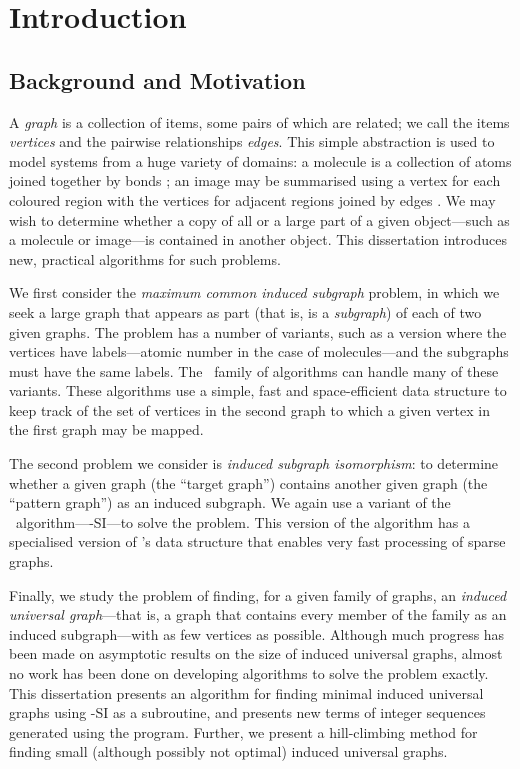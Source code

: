 \chapter{Introduction}
\label{c:intro}

\newcommand{\ChapterRef}[1] {\Cref{#1}: \nameref{#1}}

\section{Background and Motivation}
A \emph{graph} is a collection of items, some pairs of which are related; we
call the items \emph{vertices} and the pairwise relationships \emph{edges}.
This simple abstraction
is used to model systems from a huge variety of domains: a molecule is a
collection of atoms joined together by bonds \citep{sussenguth1965graph}; an
image may be summarised using a vertex for each coloured region with the
vertices for adjacent regions joined by edges
\citep{DBLP:conf/icip/OlatunbosunDE96}.  We may wish to determine whether a
copy of all
or a large part of a given object---such as a molecule or image---is contained
in another object.  This dissertation introduces new,
practical algorithms for such problems.

We first consider the \emph{maximum common induced subgraph} problem,
in which we seek a large graph that appears as part (that is,
is a \emph{subgraph}) of each of two
given graphs.  The problem has a number of variants, such as a version where
the vertices have labels---atomic number in the case of molecules---and
the subgraphs must have the same labels.
The \McSplit\ family of algorithms can handle many of these variants.  These algorithms
use a simple, fast and space-efficient data structure to keep track of the set
of vertices in the second graph to which a given vertex in the first graph may
be mapped.

The second problem we consider is \emph{induced subgraph isomorphism}: to
determine whether a given graph (the ``target graph'') contains another given
graph (the ``pattern graph'') as an induced subgraph.  We again use a variant
of the \McSplit\ algorithm---\McSplit-SI---to solve the problem. This version
of the algorithm has a specialised version of \McSplit's data structure that
enables very fast processing of sparse graphs.

Finally, we study the problem of finding, for a given family of graphs,
an \textit{induced universal graph}---that is, a graph that contains every
member of the family as an induced subgraph---with as few vertices as
possible.
Although much progress has
been made on asymptotic results on the size of induced universal graphs, almost no
work has been done on developing algorithms to solve the problem exactly.  This
dissertation presents an algorithm for finding minimal induced universal graphs
using \McSplit-SI as a subroutine, and presents new terms of integer sequences
generated using the program.  Further, we present a hill-climbing method for
finding small (although possibly not optimal) induced universal graphs.

